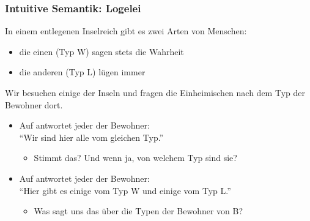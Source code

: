 \documentclass[onlymath]{beamer}
\begin{document}
\begin{frame}\frametitle{Intuitive Semantik: Logelei}

In einem entlegenen Inselreich gibt es zwei Arten von Menschen:
\begin{itemize}
\item die einen (Typ W) sagen stets die Wahrheit
\item die anderen (Typ L) lügen immer
\end{itemize}
\bigskip\pause

Wir besuchen einige der Inseln und fragen die Einheimischen
nach dem Typ der Bewohner dort.\pause

\begin{itemize}
\item Auf  antwortet jeder der Bewohner:\\ \alert{"`Wir sind hier alle vom gleichen Typ."'}\\
\begin{itemize}
\item Stimmt das? Und wenn ja, von welchem Typ sind sie?
\end{itemize}\pause
\item Auf  antwortet jeder der Bewohner:\\ \alert{"`Hier gibt es einige vom Typ W und einige vom Typ L."'}
\begin{itemize}
\item Was sagt uns das über die Typen der Bewohner von B?
\end{itemize}
\end{itemize}




\end{frame}
\end{document}
